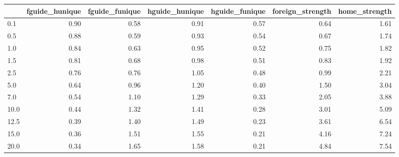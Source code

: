 \begin{tabular}{lrrrrrr}
\toprule
 & fguide_hunique & fguide_funique & hguide_hunique & hguide_funique & foreign_strength & home_strength \\
\midrule
0.1 & 0.90 & 0.58 & 0.91 & 0.57 & 0.64 & 1.61 \\
0.5 & 0.88 & 0.59 & 0.93 & 0.54 & 0.67 & 1.74 \\
1.0 & 0.84 & 0.63 & 0.95 & 0.52 & 0.75 & 1.82 \\
1.5 & 0.81 & 0.68 & 0.98 & 0.51 & 0.83 & 1.92 \\
2.5 & 0.76 & 0.76 & 1.05 & 0.48 & 0.99 & 2.21 \\
5.0 & 0.64 & 0.96 & 1.20 & 0.40 & 1.50 & 3.04 \\
7.0 & 0.54 & 1.10 & 1.29 & 0.33 & 2.05 & 3.88 \\
10.0 & 0.44 & 1.32 & 1.41 & 0.28 & 3.01 & 5.09 \\
12.5 & 0.39 & 1.40 & 1.49 & 0.23 & 3.61 & 6.54 \\
15.0 & 0.36 & 1.51 & 1.55 & 0.21 & 4.16 & 7.24 \\
20.0 & 0.34 & 1.65 & 1.58 & 0.21 & 4.84 & 7.54 \\
\bottomrule
\end{tabular}
